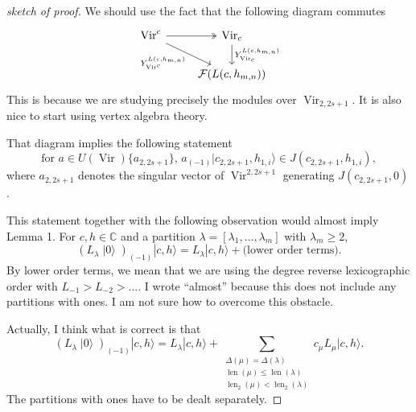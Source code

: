 \documentclass[a4paper, 12pt, reqno]{amsart}
\DeclareMathOperator{\Vir}{Vir}
\DeclareMathOperator{\len}{len}
\DeclareMathOperator{\vac}{|0\rangle}
\begin{document}
\begin{proof}[sketch of proof]
  We should use the fact that the following diagram commutes
  \begin{equation*}
    \begin{tikzcd}
      \Vir^c \arrow[r, two heads] \arrow[rd, "{Y^{L(c, h_{m, n})}_{\Vir^c}}"'] & {\Vir_c} \arrow[d, "{Y^{L(c, h_{m, n})}_{\Vir_c}}"] \\
      & {\mathcal{F}(L(c, h_{m, n}))}
    \end{tikzcd}
  \end{equation*}
  This is because we are studying precisely the modules over $\Vir_{2, 2s + 1}$.
  It is also nice to start using vertex algebra theory.

  That diagram implies the following statement
  \begin{equation*}
    \text{for $a \in U(\Vir)\{a_{2, 2s + 1}\}$, $a_{(-1)}|c_{2, 2s + 1}, h_{1, i}\rangle \in J(c_{2, 2s + 1}, h_{1, i})$},
  \end{equation*}
  where $a_{2, 2s + 1}$ denotes the singular vector of $\Vir^{2, 2s + 1}$ generating $J(c_{2, 2s + 1}, 0)$.

  This statement together with the following observation would almost imply Lemma 1.
  For $c, h \in \mathbb{C}$ and a partition $\lambda = [\lambda_1, \dots, \lambda_m]$ with $\lambda_m \ge 2$,
  \begin{equation*}
    (L_{\lambda}\vac)_{(-1)}|c, h\rangle = L_{\lambda}|c, h\rangle + \text{(lower order terms)}.
  \end{equation*}
  By lower order terms, we mean that we are using the degree reverse lexicographic order with $L_{-1} > L_{-2} > \dots$.
  I wrote ``almost'' because this does not include any partitions with ones.
  I am not sure how to overcome this obstacle.

  Actually, I think what is correct is that
  \begin{equation*}
    (L_{\lambda}\vac)_{(-1)}|c, h\rangle = L_{\lambda}|c, h\rangle + \sum_{\substack{\Delta(\mu) = \Delta(\lambda) \\ \len(\mu) \le \len(\lambda) \\ \len_2(\mu) < \len_2(\lambda)}}c_{\mu}L_{\mu}|c, h\rangle.
  \end{equation*}
  The partitions with ones have to be dealt separately.
\end{proof}
\end{document}
